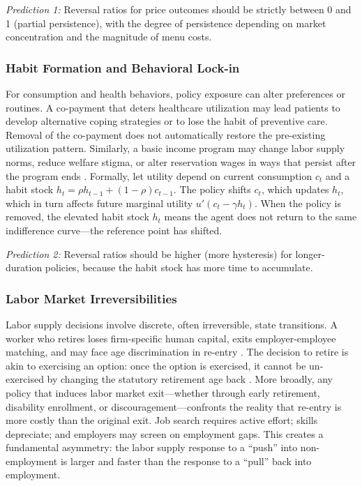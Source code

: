 \documentclass[12pt]{article}
\begin{document}
\textit{Prediction 1:} Reversal ratios for price outcomes should be strictly between 0 and 1 (partial persistence), with the degree of persistence depending on market concentration and the magnitude of menu costs.

\subsubsection{Habit Formation and Behavioral Lock-in}

For consumption and health behaviors, policy exposure can alter preferences or routines. A co-payment that deters healthcare utilization may lead patients to develop alternative coping strategies or to lose the habit of preventive care. Removal of the co-payment does not automatically restore the pre-existing utilization pattern. Similarly, a basic income program may change labor supply norms, reduce welfare stigma, or alter reservation wages in ways that persist after the program ends \citep{finkelstein2019take}. Formally, let utility depend on current consumption $c_t$ and a habit stock $h_t = \rho h_{t-1} + (1-\rho) c_{t-1}$. The policy shifts $c_t$, which updates $h_t$, which in turn affects future marginal utility $u'(c_t - \gamma h_t)$. When the policy is removed, the elevated habit stock $h_t$ means the agent does not return to the same indifference curve---the reference point has shifted.

\textit{Prediction 2:} Reversal ratios should be higher (more hysteresis) for longer-duration policies, because the habit stock has more time to accumulate.

\subsubsection{Labor Market Irreversibilities}

Labor supply decisions involve discrete, often irreversible, state transitions. A worker who retires loses firm-specific human capital, exits employer-employee matching, and may face age discrimination in re-entry \citep{autor2003rise}. The decision to retire is akin to exercising an option: once the option is exercised, it cannot be un-exercised by changing the statutory retirement age back \citep{dixit1994investment}. More broadly, any policy that induces labor market exit---whether through early retirement, disability enrollment, or discouragement---confronts the reality that re-entry is more costly than the original exit. Job search requires active effort; skills depreciate; and employers may screen on employment gaps. This creates a fundamental asymmetry: the labor supply response to a ``push'' into non-employment is larger and faster than the response to a ``pull'' back into employment.
\end{document}
